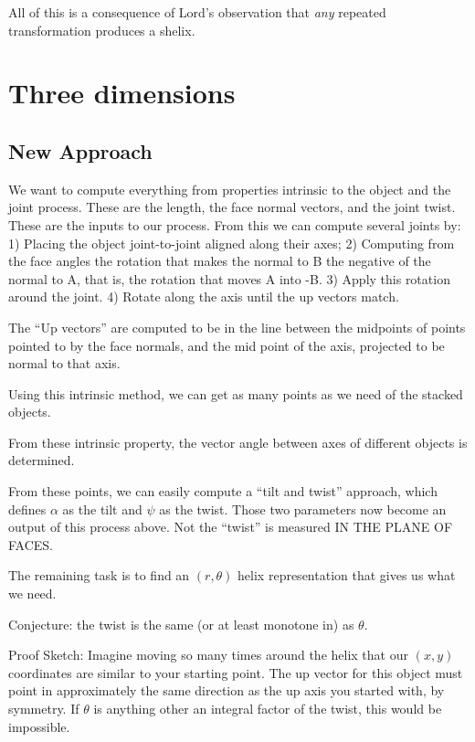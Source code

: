 \documentclass[11pt]{article}
\begin{document}
{All of this is a consequence of Lord's observation that {\em any}
repeated transformation produces a shelix.


\section{Three dimensions}

\subsection{New Approach}

We want to compute everything from properties intrinsic to the object and the joint process.
These are the length, the face normal vectors, and the joint twist. These are the
inputs to our process.  From this we can compute several joints by:
1) Placing the object joint-to-joint aligned along their axes;
2) Computing from the face angles the rotation that makes the normal to B the
negative of the normal to A, that is, the rotation that moves A into -B.
3) Apply this rotation around the joint.
4) Rotate along the axis until the up vectors match.

The ``Up vectors'' are computed to be in the line between the midpoints of points
pointed to by the face normals, and the mid point of the axis, projected to be normal
to that axis.

Using this intrinsic method, we can get as many points as we need of the stacked objects.

From these intrinsic property, the vector angle between axes of different objects
is determined.

From these points, we can easily compute a ``tilt and twist'' approach, which defines
$\alpha$ as the tilt and $\psi$ as the twist. Those two parameters now become
an output of this process above.  Not the ``twist'' is measured IN THE PLANE OF
FACES.

The remaining task is to find an $(r,\theta)$ helix representation that gives us
what we need.

Conjecture: the twist is the same (or at least monotone in) as $\theta$.

Proof Sketch: Imagine moving so many times around the helix that
our $(x,y)$ coordinates are similar to your starting point. The up vector
for this object must point in approximately the same direction as the up axis
you started with, by symmetry. If $\theta$ is anything other an integral
factor of the twist, this would be impossible.

}
\end{document}
